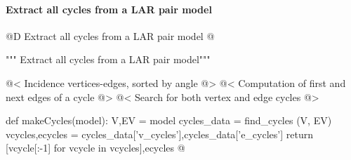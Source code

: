 \documentclass[11pt,oneside]{article}    %
\begin{document}

\paragraph{Extract all cycles from a LAR pair model}
@D Extract all cycles from a LAR pair model
@{""" Extract all cycles from a LAR pair model"""

@< Incidence vertices-edges, sorted by angle @>
@< Computation of first and next edges of a cycle @>
@< Search for both vertex and edge cycles @>

def makeCycles(model):
    V,EV = model
    cycles_data = find_cycles (V, EV)
    vcycles,ecycles = cycles_data['v_cycles'],cycles_data['e_cycles']
    return [vcycle[:-1] for vcycle in vcycles],ecycles
@}
\end{document}
